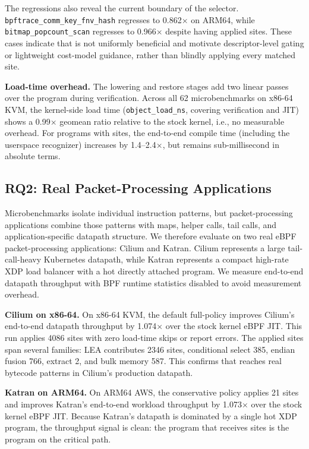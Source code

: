 The regressions also reveal the current boundary of the selector. \texttt{bpftrace\_comm\_key\_fnv\_hash} regresses to 0.862$\times$ on ARM64, while \texttt{bitmap\_popcount\_scan} regresses to 0.966$\times$ despite having applied \lang sites. These cases indicate that \lang is not uniformly beneficial and motivate descriptor-level gating or lightweight cost-model guidance, rather than blindly applying every matched \lang site.

\noindent\textbf{Load-time overhead.}
The \lang lowering and restore stages add two linear passes over the program during verification. Across all 62 microbenchmarks on x86-64 KVM, the kernel-side load time (\texttt{object\_load\_ns}, covering verification and JIT) shows a 0.99$\times$ geomean ratio relative to the stock kernel, i.e., no measurable overhead. For programs with \lang sites, the end-to-end compile time (including the userspace recognizer) increases by 1.4--2.4$\times$, but remains sub-millisecond in absolute terms.



\subsection{RQ2: Real Packet-Processing Applications}
\label{subsec:corpus_application}

Microbenchmarks isolate individual instruction patterns, but packet-processing applications combine those patterns with maps, helper calls, tail calls, and application-specific datapath structure. We therefore evaluate \lang on two real eBPF packet-processing applications: Cilium and Katran. Cilium represents a large tail-call-heavy Kubernetes datapath, while Katran represents a compact high-rate XDP load balancer with a hot directly attached program. We measure end-to-end datapath throughput with BPF runtime statistics disabled to avoid measurement overhead.

\textbf{Cilium on x86-64.}
On x86-64 KVM, the default full-\lang policy improves Cilium's end-to-end datapath throughput by 1.074$\times$ over the stock kernel eBPF JIT. This run applies 4086 \lang sites with zero load-time skips or report errors. The applied sites span several families: LEA contributes 2346 sites, conditional select 385, endian fusion 766, extract 2, and bulk memory 587. This confirms that \lang reaches real bytecode patterns in Cilium's production datapath.

\textbf{Katran on ARM64.}
On ARM64 AWS, the conservative \lang policy applies 21 sites and improves Katran's end-to-end workload throughput by 1.073$\times$ over the stock kernel eBPF JIT. Because Katran's datapath is dominated by a single hot XDP program, the throughput signal is clean: the program that receives \lang sites is the program on the critical path.

